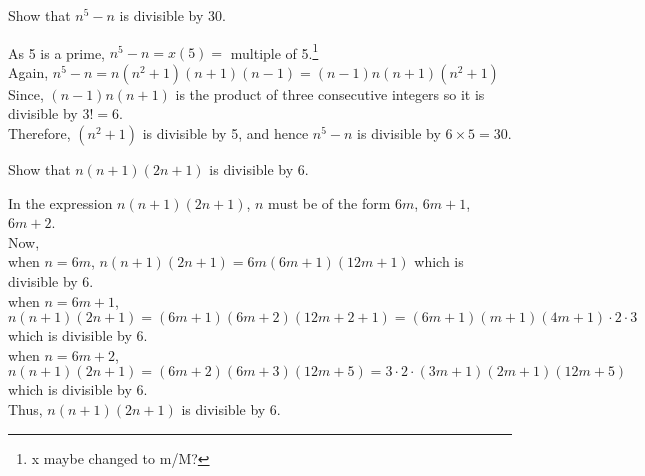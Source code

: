 \documentclass[12pt]{book}
\begin{document}
\begin{qn}[T-1]
    Show that $ n^5-n $ is divisible by 30.
\end{qn}
\begin{soln}
    As 5 is a prime, $ n^5-n=x(5)= $ multiple of 5.\footnote{x maybe changed to m/M?}\\
    Again, $ n^5-n=n(n^2+1)(n+1)(n-1)=(n-1)n(n+1)(n^2+1) $\\
    Since, $ (n-1)n(n+1) $ is the product of three consecutive integers so it is divisible by $ 3!=6 $.\\
    Therefore, $ (n^2+1) $ is divisible by 5, and hence $ n^5-n $ is divisible by $ 6\times 5=30 $.
\end{soln}
\begin{qn}[I]
    Show that $ n(n+1)(2n+1) $ is divisible by 6.
\end{qn}
\begin{soln}
    In the expression $ n(n+1)(2n+1) $, $ n $ must be of the form $ 6m $, $ 6m+1 $, $ 6m+2 $.\\
    Now,\\
    when $ n=6m $, $ n(n+1)(2n+1)= 6m(6m+1)(12m+1) $ which is divisible by 6.\\
    when $ n=6m+1 $, $ n(n+1)(2n+1)= (6m+1)(6m+2)(12m+2+1)=(6m+1)(m+1)(4m+1)\cdot2\cdot3 $ which is divisible by 6.\\
    when $ n=6m+2 $, $ n(n+1)(2n+1)= (6m+2)(6m+3)(12m+5)=3\cdot2\cdot(3m+1)(2m+1)(12m+5)$ which is divisible by 6.\\

    Thus, $ n(n+1)(2n+1) $ is divisible by 6.
\end{soln}
\end{document}
